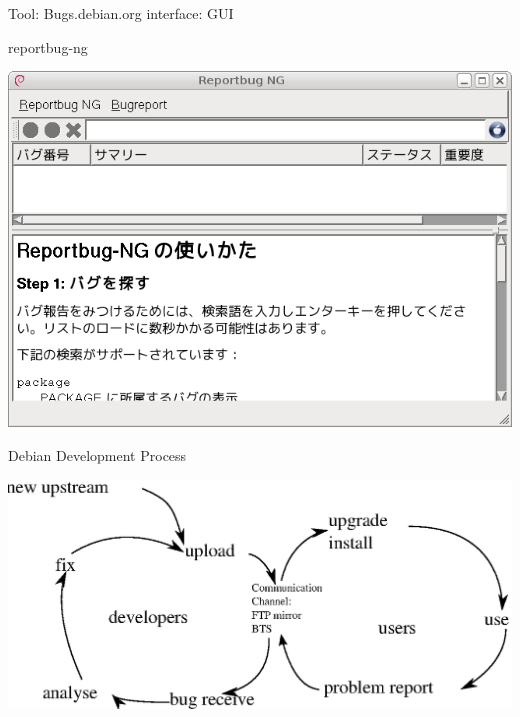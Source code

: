\documentclass[cjk,dvipdfmx,12pt]{beamer}
\begin{document}
\begin{frame}{Tool: Bugs.debian.org interface: GUI}

reportbug-ng

 \includegraphics[width=1\hsize]{image200805/reportbug-ng.png}
\end{frame}

\begin{frame}{Debian Development Process}

 \includegraphics[width=1\hsize]{image200805/develcycle.eps} 

\end{frame}
\end{document}
